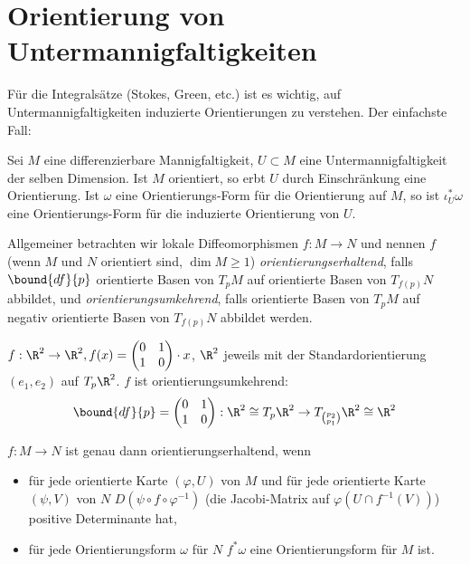 \section*{Orientierung von Untermannigfaltigkeiten}\lecture

Für die Integralsätze (Stokes, Green, etc.) ist es wichtig, auf Untermannigfaltigkeiten induzierte Orientierungen zu verstehen. Der einfachste Fall:

\begin{lem}
	Sei $M$ eine differenzierbare Mannigfaltigkeit, $U \subset M$ eine Untermannigfaltigkeit der selben Dimension. Ist $M$ orientiert, so erbt $U$ durch Einschränkung eine Orientierung. Ist $\omega$ eine Orientierungs-Form für die Orientierung auf $M$, so ist \( \iota_U^*\omega \) eine Orientierungs-Form für die induzierte Orientierung von $U$.
\end{lem}

Allgemeiner betrachten wir lokale Diffeomorphismen \( f: M \to N \) und nennen $f$ (wenn $M$ und $N$ orientiert sind, $\dim M \geq 1$) \emph{orientierungserhaltend}, falls \( \bound{df}{p} \) orientierte Basen von $T_pM$ auf orientierte Basen von \( T_{f(p)}N \) abbildet, und \emph{orientierungsumkehrend}, falls orientierte Basen von $T_pM$ auf negativ orientierte Basen von \( T_{f(p)}N \) abbildet werden.

\begin{exmp*}
	\( f: \R^2 \to \R^2, f(x) = \begin{pmatrix}
		0&1\\1&0	\end{pmatrix} \cdot x \), $\R^2$ jeweils mit der Standardorientierung $(e_1,e_2)$ auf \( T_p\R^2 \). $f$ ist orientierungsumkehrend:
	\[ \bound{df}{p} = \begin{pmatrix}
		0&1\\1&0	\end{pmatrix}: \R^2 \cong T_p\R^2 \to T_{\binom{p_2}{p_1}}\R^2 \cong \R^2 \]
\end{exmp*}

\begin{rem}
	\( f:M \to N \) ist genau dann orientierungserhaltend, wenn 
	\begin{itemize}
		\item für jede orientierte Karte \( (\varphi,U) \) von $M$ und für jede orientierte Karte \( (\psi,V) \) von $N$ \( D(\psi \circ f \circ \varphi^{-1}) \) (die Jacobi-Matrix auf \( \varphi(U \cap f^{-1}(V)) \)) positive Determinante hat,
		\item für jede Orientierungsform $\omega$ für $N$ $f^*\omega$ eine Orientierungsform für $M$ ist.
	\end{itemize}
\end{rem}

